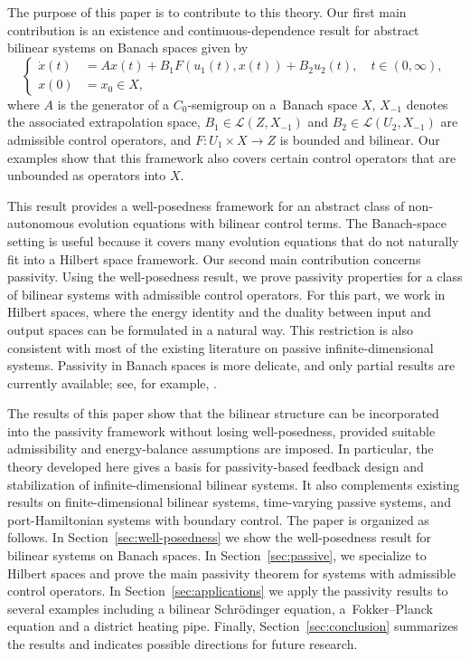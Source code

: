 \documentclass{cocv}
\theoremstyle{definition}
\begin{document}
The purpose of this paper is to contribute to this theory. Our first main contribution is an existence and continuous-dependence result for abstract bilinear systems on Banach spaces given by 
\begin{equation}\label{eq:bilinear_intro}
    \tag{$\Sigma$} \left\{
        \begin{aligned}
            \dot x(t) &= Ax(t) + B_1F(u_1(t),x(t)) + B_2u_2(t), \quad t\in (0, \infty),\\
            x(0) &= x_0 \in X,
        \end{aligned} \right.
    \end{equation}
where $A$ is the generator of a $C_0$-semigroup on a~Banach space $X$,
$X_{-1}$ denotes the associated extrapolation space,
$B_1\in\mathcal L(Z,X_{-1})$ and $B_2\in\mathcal L(U_2,X_{-1})$ are
admissible control operators, and $F\colon U_1\times X\to Z$ is bounded and
bilinear. Our examples show that this framework also covers certain control
operators that are unbounded as operators into $X$.

This result provides a well-posedness framework for an abstract class of non-autonomous evolution equations with bilinear control terms. The Banach-space setting is useful because it covers many evolution equations that do not naturally fit into a Hilbert space framework.
Our second main contribution concerns passivity. Using the well-posedness result, we prove passivity properties for a class of bilinear systems with admissible control operators. For this part, we work in Hilbert spaces, where the energy identity and the duality between input and output spaces can be formulated in a natural way. This restriction is also consistent with most of the existing literature on passive infinite-dimensional systems. Passivity in Banach spaces is more delicate, and only partial results are currently available; see, for example, \cite{Iftime05,Reis2021}.

The results of this paper show that the bilinear structure can be incorporated into the passivity framework without losing well-posedness, provided suitable admissibility and energy-balance assumptions are imposed. In particular, the theory developed here gives a basis for passivity-based feedback design and stabilization of infinite-dimensional bilinear systems. It also complements existing results on finite-dimensional bilinear systems, time-varying passive systems, and port-Hamiltonian systems with boundary control.
The paper is organized as follows. In Section~\ref{sec:well-posedness} we show the well-posedness result for bilinear systems on Banach spaces. In Section~\ref{sec:passive}, we specialize to Hilbert spaces and prove the main passivity theorem for systems with admissible control operators. In Section~\ref{sec:applications} we apply the passivity results to several examples including a bilinear Schrödinger equation, a~Fokker--Planck equation and a district heating pipe. Finally, Section~\ref{sec:conclusion} summarizes the results and indicates possible directions for future research.
\end{document}
